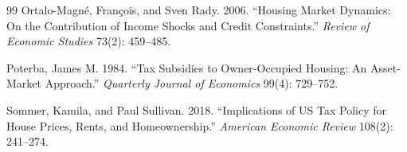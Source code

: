 \documentclass[11pt]{article}
\newcommand{\1}{\mathbf 1}
\begin{document}
\begin{thebibliography}{99}
Ortalo-Magn\'e, Fran\c{c}ois, and Sven Rady. 2006. ``Housing Market Dynamics: On the Contribution of Income Shocks and Credit Constraints.'' \emph{Review of Economic Studies} 73(2): 459--485.

Poterba, James M. 1984. ``Tax Subsidies to Owner-Occupied Housing: An Asset-Market Approach.'' \emph{Quarterly Journal of Economics} 99(4): 729--752.

Sommer, Kamila, and Paul Sullivan. 2018. ``Implications of US Tax Policy for House Prices, Rents, and Homeownership.'' \emph{American Economic Review} 108(2): 241--274.

\end{thebibliography}
\end{document}
